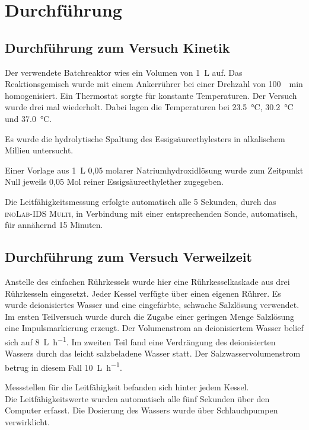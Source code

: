\section{Durchführung}
\label{sec:durchfuerung}

\subsection{Durchführung zum Versuch Kinetik}
Der verwendete Batchreaktor wies ein Volumen von \SI{1}{\liter} auf. Das Reaktionsgemisch wurde mit einem Ankerrührer bei einer Drehzahl von \SI{100}{\per\minute} homogenisiert. Ein Thermostat sorgte für konstante Temperaturen. 
Der Versuch wurde drei mal wiederholt. Dabei lagen die Temperaturen bei \SI{23,5}{\degreeCelsius}, \SI{30,2}{\degreeCelsius} und \SI{37,0}{\degreeCelsius}.

Es wurde die hydrolytische Spaltung des Essigsäureethylesters in alkalischem Millieu untersucht. 

Einer Vorlage aus \SI{1}{\liter} 0,05 molarer Natriumhydroxidlösung wurde zum Zeitpunkt Null jeweils 0,05 Mol reiner Essigsäureethylether zugegeben.   

Die Leitfähigkeitsmessung erfolgte automatisch alle 5 Sekunden, durch das \textsc{inoLab-IDS Multi}, in Verbindung mit einer entsprechenden Sonde, automatisch, für annähernd 15 Minuten.

\subsection{Durchführung zum Versuch Verweilzeit}

Anstelle des einfachen Rührkessels wurde hier eine Rührkesselkaskade aus drei Rührkesseln eingesetzt. Jeder Kessel verfügte über einen eigenen Rührer. Es wurde deionisiertes Wasser und eine eingefärbte, schwache Salzlösung verwendet. 
Im ersten Teilversuch wurde durch die Zugabe einer geringen Menge Salzlösung eine Impulsmarkierung erzeugt.  
Der Volumenstrom an deionisiertem Wasser belief sich auf \SI{8}{\liter\per\hour}.\linebreak
Im zweiten Teil fand eine Verdrängung des deionisierten Wassers durch das leicht salzbeladene Wasser statt. Der Salzwasservolumenstrom betrug in diesem Fall \SI{10}{\liter\per\hour}.

Messstellen für die Leitfähigkeit befanden sich hinter jedem Kessel. \\Die Leitfähigkeitswerte wurden automatisch alle fünf Sekunden über den Computer erfasst.
Die Dosierung des Wassers wurde über Schlauchpumpen verwirklicht.
